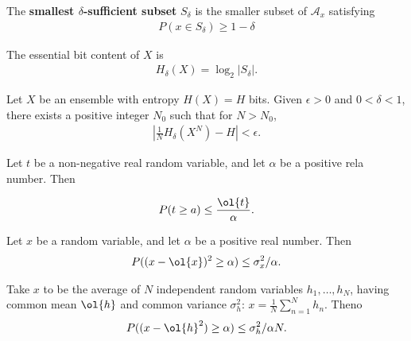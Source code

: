 \def\AA{\mathcal{A}}
\begin{definition}
  The {\bf smallest $\delta$-sufficient subset} $S_{\delta}$ is the smaller subset of $\AA_x$ satisfying
  \begin{align*}
    P(x \in S_{\delta}) \geq 1 - \delta
  \end{align*}
\end{definition}

\medskip

\begin{definition}
  The {essential bit content} of $X$ is
  \begin{align*}
    H_{\delta}(X) = \log_2 |S_{\delta}|.
  \end{align*}
\end{definition}

\begin{theorem} Let $X$ be an ensemble with entropy $H(X) = H$ bits.  Given $\epsilon > 0$ and $0 < \delta < 1$, there exists a positive integer $N_0$ such that for $N > N_0$, 
  \begin{align*}
    \left | \frac{1}{N} H_{\delta} (X^N) - H \right | < \epsilon.
  \end{align*}
\end{theorem}

\begin{theorem} Let $t$ be a non-negative real random variable, and let $\alpha$ be a positive rela number.  Then

  \begin{align*}
    P(t \geq a) \leq \frac{\ol{t}}{\alpha}.
  \end{align*}
\end{theorem}

\begin{theorem}
  Let $x$ be a random variable, and let $\alpha$ be a positive real number.  Then
  \begin{align*}
    P( (x - \ol{x})^2 \geq \alpha) \leq \sigma_x^2 / \alpha.
  \end{align*}
\end{theorem}

\begin{theorem} Take $x$ to be the average of $N$ independent random variables $h_1, \dots, h_N$, having common mean $\ol{h}$ and common variance $\sigma_h^2$: $x = \frac{1}{N} \sum_{n=1}^{N} h_n$.  Theno
  \begin{align*}
    P( (x - \ol{h}^2) \geq \alpha) \leq \sigma_h^2 / \alpha N.
  \end{align*}
\end{theorem}

